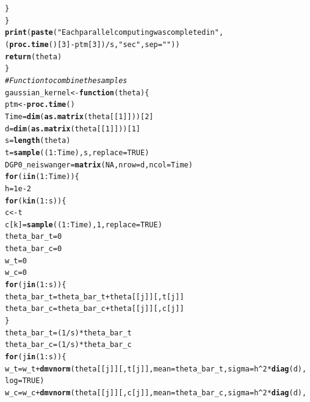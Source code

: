 \documentclass[11pt,a4paper]{report}\usepackage[]{graphicx}\usepackage[]{color}
\makeatletter
\newcommand{\hlnum}[1]{\textcolor[rgb]{0.686,0.059,0.569}{#1}}%
\newcommand{\hlstr}[1]{\textcolor[rgb]{0.192,0.494,0.8}{#1}}%
\newcommand{\hlcom}[1]{\textcolor[rgb]{0.678,0.584,0.686}{\textit{#1}}}%
\newcommand{\hlopt}[1]{\textcolor[rgb]{0,0,0}{#1}}%
\newcommand{\hlstd}[1]{\textcolor[rgb]{0.345,0.345,0.345}{#1}}%
\newcommand{\hlkwa}[1]{\textcolor[rgb]{0.161,0.373,0.58}{\textbf{#1}}}%
\newcommand{\hlkwb}[1]{\textcolor[rgb]{0.69,0.353,0.396}{#1}}%
\newcommand{\hlkwc}[1]{\textcolor[rgb]{0.333,0.667,0.333}{#1}}%
\newcommand{\hlkwd}[1]{\textcolor[rgb]{0.737,0.353,0.396}{\textbf{#1}}}%
\newenvironment{kframe}{%
 \def\at@end@of@kframe{}%
 \ifinner\ifhmode%
  \def\at@end@of@kframe{\end{minipage}}%
  \begin{minipage}{\columnwidth}%
 \fi\fi%
 \def\FrameCommand##1{\hskip\@totalleftmargin \hskip-\fboxsep
 \colorbox{shadecolor}{##1}\hskip-\fboxsep
     \hskip-\linewidth \hskip-\@totalleftmargin \hskip\columnwidth}%
 \MakeFramed {\advance\hsize-\width
   \@totalleftmargin\z@ \linewidth\hsize
   \@setminipage}}%
 {\par\unskip\endMakeFramed%
 \at@end@of@kframe}
\newenvironment{knitrout}{}{} %
\makeatother
\begin{document}
\begin{appendix}
\begin{knitrout}
\begin{kframe}
\begin{alltt}
    \hlstd{\}}
  \hlstd{\}}
  \hlkwd{print}\hlstd{(}\hlkwd{paste}\hlstd{(}\hlstr{"Each parallel computing was completed in "}\hlstd{,}
              \hlstd{(}\hlkwd{proc.time}\hlstd{()[}\hlnum{3}\hlstd{]}\hlopt{-}\hlstd{ptm[}\hlnum{3}\hlstd{])}\hlopt{/}\hlstd{s,}\hlstr{" sec"}\hlstd{,} \hlkwc{sep}\hlstd{=}\hlstr{""}\hlstd{))}
  \hlkwd{return}\hlstd{(theta)}
\hlstd{\}}
\hlcom{#Function to combine the samples}
\hlstd{gaussian_kernel}\hlkwb{<-}\hlkwa{function}\hlstd{(}\hlkwc{theta}\hlstd{) \{}
  \hlstd{ptm}\hlkwb{<-}\hlkwd{proc.time}\hlstd{()}
  \hlstd{Time}\hlkwb{=}\hlkwd{dim}\hlstd{(}\hlkwd{as.matrix}\hlstd{(theta[[}\hlnum{1}\hlstd{]]))[}\hlnum{2}\hlstd{]}
  \hlstd{d}\hlkwb{=}\hlkwd{dim}\hlstd{(}\hlkwd{as.matrix}\hlstd{(theta[[}\hlnum{1}\hlstd{]]))[}\hlnum{1}\hlstd{]}
  \hlstd{s}\hlkwb{=}\hlkwd{length}\hlstd{(theta)}
  \hlstd{t}\hlkwb{=}\hlkwd{sample}\hlstd{((}\hlnum{1}\hlopt{:}\hlstd{Time),s,}\hlkwc{replace} \hlstd{=} \hlnum{TRUE}\hlstd{)}
  \hlstd{DGP0_neiswanger}\hlkwb{=}\hlkwd{matrix}\hlstd{(}\hlnum{NA}\hlstd{,}\hlkwc{nrow}\hlstd{=d,}\hlkwc{ncol}\hlstd{=Time)}
  \hlkwa{for}\hlstd{(i} \hlkwa{in} \hlstd{(}\hlnum{1}\hlopt{:}\hlstd{Time)) \{}
    \hlstd{h}\hlkwb{=}\hlnum{1e-2}
    \hlkwa{for}\hlstd{(k} \hlkwa{in} \hlstd{(}\hlnum{1}\hlopt{:}\hlstd{s)) \{}
      \hlstd{c}\hlkwb{<-}\hlstd{t}
      \hlstd{c[k]}\hlkwb{=}\hlkwd{sample}\hlstd{((}\hlnum{1}\hlopt{:}\hlstd{Time),}\hlnum{1}\hlstd{,}\hlkwc{replace} \hlstd{=} \hlnum{TRUE}\hlstd{)}
      \hlstd{theta_bar_t}\hlkwb{=}\hlnum{0}
      \hlstd{theta_bar_c}\hlkwb{=}\hlnum{0}
      \hlstd{w_t}\hlkwb{=}\hlnum{0}
      \hlstd{w_c}\hlkwb{=}\hlnum{0}
      \hlkwa{for} \hlstd{(j} \hlkwa{in} \hlstd{(}\hlnum{1}\hlopt{:}\hlstd{s)) \{}
        \hlstd{theta_bar_t}\hlkwb{=}\hlstd{theta_bar_t}\hlopt{+}\hlstd{theta[[j]][,t[j]]}
        \hlstd{theta_bar_c}\hlkwb{=}\hlstd{theta_bar_c}\hlopt{+}\hlstd{theta[[j]][,c[j]]}
      \hlstd{\}}
      \hlstd{theta_bar_t}\hlkwb{=}\hlstd{(}\hlnum{1}\hlopt{/}\hlstd{s)}\hlopt{*}\hlstd{theta_bar_t}
      \hlstd{theta_bar_c}\hlkwb{=}\hlstd{(}\hlnum{1}\hlopt{/}\hlstd{s)}\hlopt{*}\hlstd{theta_bar_c}
      \hlkwa{for} \hlstd{(j} \hlkwa{in} \hlstd{(}\hlnum{1}\hlopt{:}\hlstd{s)) \{}
        \hlstd{w_t}\hlkwb{=}\hlstd{w_t} \hlopt{+} \hlkwd{dmvnorm}\hlstd{(theta[[j]][,t[j]],}\hlkwc{mean}\hlstd{=theta_bar_t,}\hlkwc{sigma}\hlstd{=h}\hlopt{^}\hlnum{2}\hlopt{*}\hlkwd{diag}\hlstd{(d),}
                          \hlkwc{log}\hlstd{=}\hlnum{TRUE}\hlstd{)}
        \hlstd{w_c}\hlkwb{=}\hlstd{w_c} \hlopt{+} \hlkwd{dmvnorm}\hlstd{(theta[[j]][,c[j]],}\hlkwc{mean}\hlstd{=theta_bar_c,}\hlkwc{sigma}\hlstd{=h}\hlopt{^}\hlnum{2}\hlopt{*}\hlkwd{diag}\hlstd{(d),}

\end{alltt}
\end{kframe}
\end{knitrout}
\end{appendix}
\end{document}
